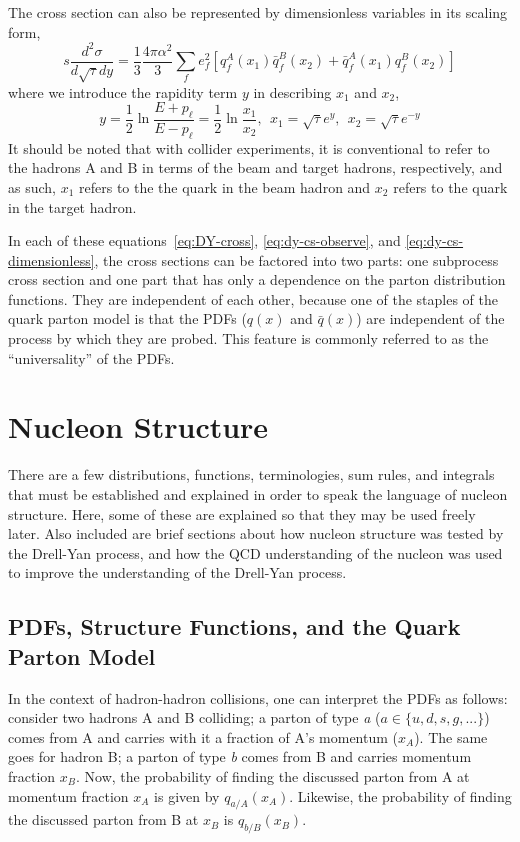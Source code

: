 The cross section can also be represented by dimensionless variables in its scaling form,
\begin{equation}
s \frac{d^2\sigma}{d \sqrt{\tau} dy} = 
\frac{1}{3}\frac{4\pi\alpha^2}{3}
\sum_{f}e_f^2[q_f^A(x_1)\bar{q}_f^B(x_2)+
\bar{q}_f^A(x_1)q_f^B(x_2)]
\label{eq:dy-cs-dimensionless}
\end{equation}
where we introduce the rapidity term $y$ in describing $x_1$ and $x_2$,
\begin{equation}
y  = \frac{1}{2} \ln \frac{E+ p_\ell}{E-p_\ell} = \frac{1}{2} \ln \frac{x_1}{x_2},\ \ 
x_1  = \sqrt{\tau} e^{y},\ \  
x_2  = \sqrt{\tau} e^{-y}
\end{equation}
It should be noted that with collider experiments, it is conventional to refer to the hadrons A and B in terms of the beam and target hadrons, respectively, and as such, $x_1$ refers to the the quark in the beam hadron and $x_2$ refers to the quark in the target hadron.

In each of these equations~\ref{eq:DY-cross}, \ref{eq:dy-cs-observe}, and \ref{eq:dy-cs-dimensionless}, the cross sections can be factored into two parts: one subprocess cross section and one part that has only a dependence on the parton distribution functions. They are independent of each other, because one of the staples of the quark parton model is that the PDFs ($q(x)$ and $\bar{q}(x)$) are independent of the process by which they are probed. This feature is commonly referred to as the ``universality'' of the PDFs.

\section{Nucleon Structure}

There are a few distributions, functions, terminologies, sum rules, and integrals that must be established and explained in order to speak the language of nucleon structure. Here, some of these are explained so that they may be used freely later. Also included are brief sections about how nucleon structure was tested by the Drell-Yan process, and how the QCD understanding of the nucleon was used to improve the understanding of the Drell-Yan process.

\subsection{PDFs, Structure Functions, and the Quark Parton Model}

In the context of hadron-hadron collisions, one can interpret the PDFs as follows: consider two hadrons A and B colliding; a parton of type \emph{a} ($a\in \{u, d, s, g, ...\}$) comes from A and carries with it a fraction of A's momentum ($x_A$).  The same goes for hadron B; a parton of type \emph{b} comes from B and carries momentum fraction $x_B$. Now, the probability of finding the discussed parton from A at momentum fraction $x_A$ is given by $q_{a/A}(x_A)$. Likewise, the probability of finding the discussed parton from B at $x_B$ is $q_{b/B}(x_B)$.


